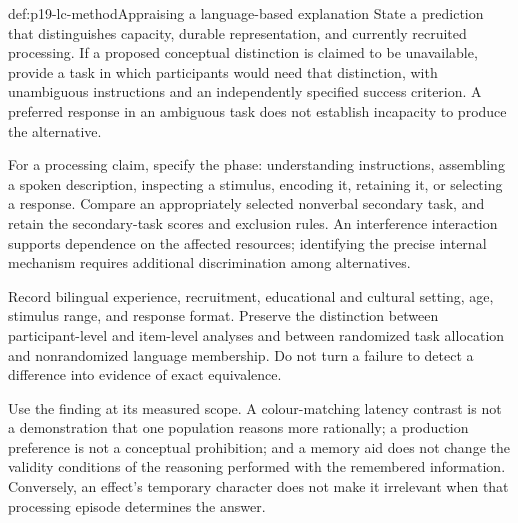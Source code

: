 \begin{hbmethod}{def:p19-lc-method}{Appraising a language-based explanation}
State a prediction that distinguishes capacity, durable representation,
and currently recruited processing. If a proposed conceptual distinction
is claimed to be unavailable, provide a task in which participants would
need that distinction, with unambiguous instructions and an independently
specified success criterion. A preferred response in an ambiguous task
does not establish incapacity to produce the alternative.

For a processing claim, specify the phase: understanding instructions,
assembling a spoken description, inspecting a stimulus, encoding it,
retaining it, or selecting a response. Compare an appropriately selected
nonverbal secondary task, and retain the secondary-task scores and
exclusion rules. An interference interaction supports dependence on the
affected resources; identifying the precise internal mechanism requires
additional discrimination among alternatives.

Record bilingual experience, recruitment, educational and cultural setting,
age, stimulus range, and response format. Preserve the distinction between
participant-level and item-level analyses and between randomized task
allocation and nonrandomized language membership. Do not turn a failure
to detect a difference into evidence of exact equivalence.

Use the finding at its measured scope. A colour-matching latency contrast
is not a demonstration that one population reasons more rationally; a
production preference is not a conceptual prohibition; and a memory aid
does not change the validity conditions of the reasoning performed with
the remembered information. Conversely, an effect's temporary character
does not make it irrelevant when that processing episode determines the
answer.
\end{hbmethod}

